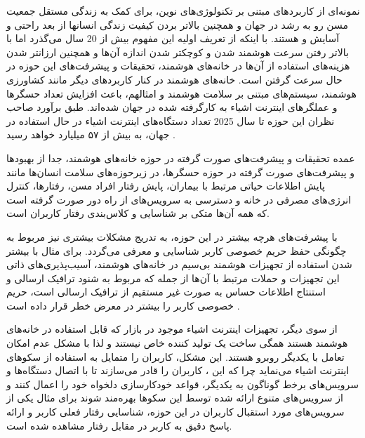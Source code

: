 
 نمونه‌ای از کاربردهای مبتنی بر تکنولوژی‌های نوین، برای کمک به زندگی مستقل جمعیت مسن رو به رشد در جهان و همچنین بالاتر بردن کیفیت زندگی انسانها از بعد راحتی و آسایش و  هستند. با اینکه از تعریف اولیه این مفهوم بیش از 20 سال می‌گذرد اما با بالاتر رفتن سرعت هوشمند شدن  و کوچکتر شدن اندازه آن‌ها و همچنین ارزانتر شدن هزینه‌های استفاده از آن‌ها در خانه‌های هوشمند، تحقیقات و پیشرفت‌های این حوزه در حال سرعت گرفتن است. خانه‌های هوشمند در کنار کاربردهای دیگر  مانند کشاورزی هوشمند، سیستم‌های مبتنی بر سلامت هوشمند و امثالهم، باعث افزایش تعداد حسگرها و عملگرهای اینترنت اشیاء به کارگرفته شده در جهان شده‌اند. طبق برآورد صاحب نظران اين حوزه ﺗﺎ ﺳﺎل 2025 ﺗﻌﺪاد دﺳﺘﮕﺎهﻫﺎی اﯾﻨﺘﺮﻧﺖ اﺷﯿﺎء در ﺣﺎل اﺳﺘﻔﺎده در ﺟﻬﺎن، ﺑﻪ ﺑﯿﺶ از ۵۷ ﻣﯿﻠﯿﺎرد ﺧﻮاﻫﺪ رسید \cite{x11}.

عمده تحقیقات و پیشرفت‌های صورت گرفته در حوزه خانه‌های هوشمند، جدا از بهبودها و پیشرفت‌های صورت گرفته در حوزه حسگرها، در زیرحوزه‌های سلامت انسان‌ها مانند پایش اطلاعات حیاتی مرتبط با بیماران، پایش رفتار افراد مسن،  رفتارها، کنترل انرژی‌های مصرفی در خانه و دسترسی به سرویس‌های از راه دور صورت گرفته است که همه آن‌ها متکی بر شناسایی و کلاس‌بندی رفتار کاربران است.

با پیشرفت‌های هرچه بیشتر در این حوزه، به تدريج مشکلات بیشتری نیز مربوط به چگونگی حفظ حریم‌ خصوصی کاربر شناسایی و معرفی می‌گردد. برای مثال با بیشتر شدن استفاده از تجهیزات هوشمند بی‌سیم در خانه‌های هوشمند، آسیب‌پذیری‌های ذاتی این تجهيزات و حملات مرتبط با آن‌ها از جمله  که مربوط به شنود ترافیک ارسالی و استنتاج اطلاعات حساس به صورت غیر مستقیم از ترافیک ارسالی است، حریم خصوصی کاربر را بیشتر در معرض خطر قرار داده است \cite{x12}. 

از سوی ديگر، تجهیزات اینترنت اشیاء موجود در بازار که قابل استفاده در خانه‌های هوشمند هستند همگی ساخت یک تولید کننده خاص نیستند و لذا با مشکل عدم امکان ﺗﻌﺎﻣﻞ با یکديگر روبرو هستند. این مشکل، کاربران را متمایل به استفاده از ﺳﮑﻮﻫﺎی اﯾﻨﺘﺮﻧﺖ اﺷﯿﺎء می‌نمايد چرا که این ، ﮐﺎرﺑﺮان را ﻗﺎدر ﻣﯽﺳﺎزﻧﺪ ﺗﺎ ﺑﺎ اﺗﺼﺎل دﺳﺘﮕﺎهﻫﺎ و ﺳﺮوﯾﺲﻫﺎی ﺑﺮﺧط ﮔﻮﻧﺎﮔﻮن ﺑﻪ ﯾﮑﺪﯾﮕﺮ، قواعد ﺧﻮدﮐﺎرﺳﺎزی دﻟﺨﻮاه خود را اﻋﻤﺎل ﮐﻨﻨﺪ و از سرویس‌های متنوع ارائه شده توسط این سکوها بهره‌مند شوند برای مثال یکی از سرویس‌های مورد استقبال کاربران در این حوزه، شناسایی رفتار فعلی کاربر و ارائه پاسخ دقیق به کاربر در مقابل رفتار مشاهده شده است.

